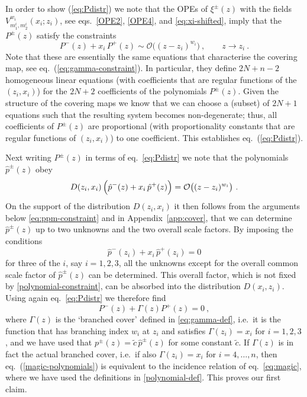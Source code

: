 \documentclass[a4paper,11pt]{article}
\numberwithin{equation}{section}
\def\be{\begin{equation}}
\def\ee{\end{equation}}
\begin{document}
In order to show (\ref{eq:Pdistr}) we note that the OPEs of $\xi^\pm(z)$ with the fields $V^{w_i}_{m_1^i,m_2^i}(x_i;z_i)$, see eqs.~\eqref{OPE2}, \eqref{OPE4}, and \eqref{eq:xi-shifted}, imply  that the $P^{\pm}(z)$ satisfy the constraints
\begin{equation}
P^-(z)+x_i \, P^+(z)\sim \mathcal{O} \bigl((z-z_i)^{w_i} \bigr)\ ,\qquad z\to z_i \ . 
\label{polynomial-constraint2}
\end{equation}
Note that these are essentially the same equations that characterise the covering map, see eq.~(\ref{eq:gamma-constraint}). In particular, they define $2N+n-2$ homogeneous linear equations (with coefficients that are regular functions of the $(z_i,x_i)$) for the $2N+2$ coefficients of the polynomials $P^\pm(z)$. Given the structure of the covering maps we know that we can choose a (subset) of $2N+1$ equations such that the resulting system becomes non-degenerate; thus, all coefficients of $P^\pm(z)$ are proportional (with proportionality constants that are regular functions of $(z_i,x_i)$) to one coefficient. This establishes eq.~(\ref{eq:Pdistr}).

Next writing $P^\pm(z)$ in terms of eq.~\eqref{eq:Pdistr} we note that the polynomials $\hat{p}^{\pm}(z)$ obey
\be
D(z_i, x_i)\, \Bigl( \hat{p}^-(z)+x_i\,\hat{p}^+(z) \Bigr)= \mathcal{O}\bigl((z-z_i)^{w_i}\bigr)\ .
\label{eq:branching}
\ee
On the support of the distribution $D(z_i, x_i)$ it then follows from the arguments below \eqref{eq:ppm-constraint} and in Appendix~\ref{app:cover}, that we can determine $\hat{p}^{\pm}(z)$ up to two unknowns and the two overall scale factors. By imposing the conditions 
\begin{equation}
\hat{p}^-(z_i)+x_i \, \hat{p}^+(z_i) =0  
\label{polynomial-constraint}
\end{equation}
for three of the $i$, say $i=1,2,3$, all the unknowns except for the overall common scale factor of $\hat{p}^{\pm}(z)$ can be determined. This overall factor, which is not fixed by \eqref{polynomial-constraint}, can be absorbed into the distribution $D(x_i, z_i)$. Using again eq.~\eqref{eq:Pdistr} we therefore find 
\begin{equation}
P^-(z)+\Gamma(z)P^+(z)=0\ ,
\label{magic-polynomials}
\end{equation}
where $\Gamma(z)$ is the `branched cover' defined in \eqref{eq:gamma-def}, i.e.\ it is the function that has  branching index $w_i$ at $z_i$ and satisfies $\Gamma(z_i) = x_i$ for $i=1,2,3$, 
and we have used that $p^\pm(z)= \tilde{c} \, \hat{p}^\pm(z)$ for some constant $\tilde{c}$. If $\Gamma(z)$ is in fact the actual branched cover, i.e.\ if also $\Gamma(z_i) = x_i$  for $i=4,\ldots,n$, then eq.~(\ref{magic-polynomials}) is equivalent to the incidence relation of eq.~\eqref{eq:magic}, where we have used the definitions in \eqref{polynomial-def}. This proves our first claim. 
\end{document}
